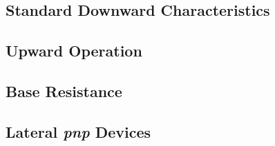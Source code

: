 \subsection{Standard Downward Characteristics}

\subsection{Upward Operation}

\subsection{Base Resistance}

\subsection{Lateral \textit{pnp} Devices}